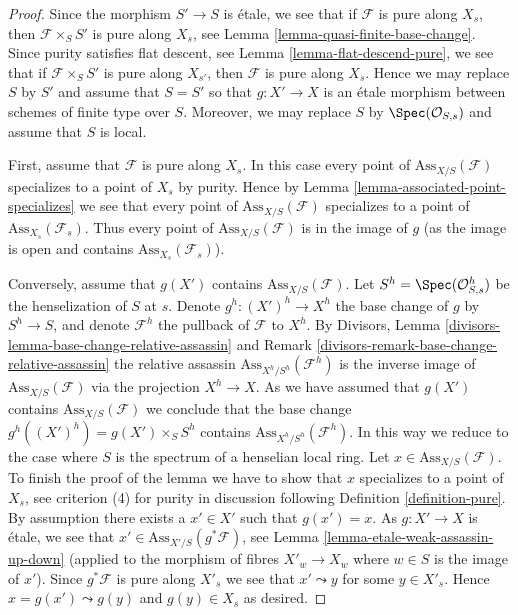 \begin{proof}
Since the morphism $S' \to S$ is \'etale, we see that if $\mathcal{F}$
is pure along $X_s$, then $\mathcal{F} \times_S S'$ is pure along
$X_s$, see
Lemma \ref{lemma-quasi-finite-base-change}.
Since purity satisfies flat descent, see
Lemma \ref{lemma-flat-descend-pure},
we see that if $\mathcal{F} \times_S S'$ is pure along $X_{s'}$, then
$\mathcal{F}$ is pure along $X_s$. Hence we may replace $S$ by $S'$
and assume that $S = S'$ so that $g : X' \to X$ is an \'etale morphism
between schemes of finite type over $S$. Moreover, we may replace
$S$ by $\Spec(\mathcal{O}_{S, s})$ and assume that $S$ is local.

\medskip\noindent
First, assume that $\mathcal{F}$ is pure along $X_s$.
In this case every point of $\text{Ass}_{X/S}(\mathcal{F})$
specializes to a point of $X_s$ by purity. Hence by
Lemma \ref{lemma-associated-point-specializes}
we see that every point of $\text{Ass}_{X/S}(\mathcal{F})$
specializes to a point of $\text{Ass}_{X_s}(\mathcal{F}_s)$.
Thus every point of $\text{Ass}_{X/S}(\mathcal{F})$ is in the
image of $g$ (as the image is open and contains
$\text{Ass}_{X_s}(\mathcal{F}_s)$).

\medskip\noindent
Conversely, assume that $g(X')$ contains $\text{Ass}_{X/S}(\mathcal{F})$.
Let $S^h = \Spec(\mathcal{O}_{S, s}^h)$ be the henselization
of $S$ at $s$. Denote $g^h : (X')^h \to X^h$ the base change of $g$
by $S^h \to S$, and denote $\mathcal{F}^h$ the pullback of $\mathcal{F}$
to $X^h$. By
Divisors, Lemma \ref{divisors-lemma-base-change-relative-assassin} and
Remark \ref{divisors-remark-base-change-relative-assassin}
the relative assassin $\text{Ass}_{X^h/S^h}(\mathcal{F}^h)$
is the inverse image of $\text{Ass}_{X/S}(\mathcal{F})$ via the projection
$X^h \to X$. As we have assumed that $g(X')$ contains
$\text{Ass}_{X/S}(\mathcal{F})$ we conclude that the base change
$g^h((X')^h) = g(X') \times_S S^h$ contains
$\text{Ass}_{X^h/S^h}(\mathcal{F}^h)$. In this way
we reduce to the case where $S$ is the spectrum of a henselian local ring.
Let $x \in \text{Ass}_{X/S}(\mathcal{F})$. To finish the proof of the
lemma we have to show that $x$ specializes to a point of $X_s$, see
criterion (4) for purity in discussion following
Definition \ref{definition-pure}.
By assumption there exists a $x' \in X'$ such that $g(x') = x$.
As $g : X' \to X$ is \'etale, we see that
$x' \in \text{Ass}_{X'/S}(g^*\mathcal{F})$, see
Lemma \ref{lemma-etale-weak-assassin-up-down} (applied to
the morphism of fibres $X'_w \to X_w$ where $w \in S$ is the image of $x'$).
Since $g^*\mathcal{F}$ is pure along $X'_s$ we see that $x' \leadsto y$
for some $y \in X'_s$. Hence $x = g(x') \leadsto g(y)$ and
$g(y) \in X_s$ as desired.
\end{proof}

